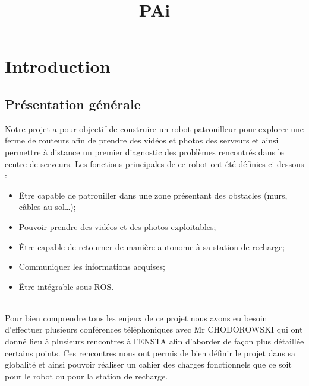 \documentclass[french]{rapportENSTAB}
\title{PAi} %
\begin{document}





        
\fairemarges %
\fairepagedegarde %
\tableofcontents
\newpage

\section{Introduction} 
\subsection{Présentation générale} 
Notre projet a pour objectif de construire un robot patrouilleur pour explorer une ferme de routeurs afin de prendre des vidéos et photos des serveurs et ainsi permettre à distance un premier diagnostic des problèmes rencontrés dans le centre de serveurs. Les fonctions principales de ce robot ont été définies ci-dessous :\begin{itemize}[label=\textbullet, font=\small\color{blue}]
    \item Être capable de patrouiller dans une zone présentant des obstacles (murs, câbles au sol…);
    \item Pouvoir prendre des vidéos et des photos exploitables;
    \item Être capable de retourner de manière autonome à sa station de recharge;
    \item Communiquer les informations acquises;
    \item Être intégrable sous ROS.
\end{itemize}\\


Pour bien comprendre tous les enjeux de ce projet nous avons eu besoin d’effectuer plusieurs conférences téléphoniques avec Mr CHODOROWSKI qui ont donné lieu à plusieurs rencontres à l’ENSTA afin d’aborder de façon plus détaillée certains points. Ces rencontres nous ont permis de bien définir le projet dans sa globalité et ainsi pouvoir réaliser un cahier des charges fonctionnels que ce soit pour le robot ou pour la station de recharge.\\
\end{document}
